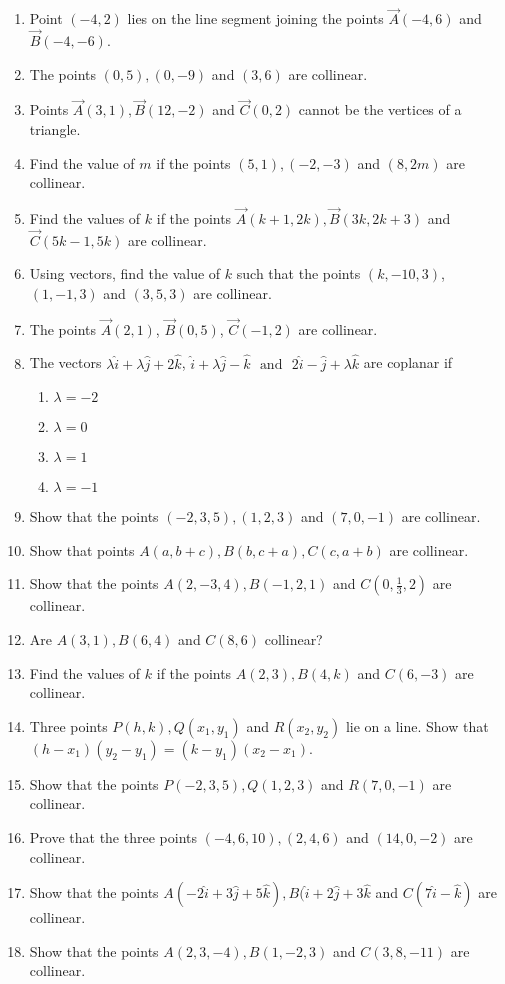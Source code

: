 \begin{enumerate}[label=\thesubsection.\arabic*,ref=\thesubsection.\theenumi]
	\item Point $ (-4,2)$ lies on the line segment joining the points $ \vec{A}(-4,6)$  and  $\vec{B}(-4,-6)$.
 \item The points $(0,5),(0,-9)$ and $(3,6)$ are collinear.
\item Points $\vec{A}(3,1), \vec{B}(12,-2)$  and  $\vec {C}(0,2)$ cannot be the vertices of a triangle.
\item Find the value of $m$ if the points $(5,1),(-2,-3)$  and $(8,2m)$ are collinear.
\item Find the values of $k$ if the points $\vec{A}(k+1,2k),\vec{B}(3k,2k+3)$ and $\vec{C}(5k-1,5k)$ are collinear.
\item Using vectors, find the value of $k$ such that the points $(k,-10,3)$, $(1,-1,3)$  and  $(3,5,3)$ are collinear.
\item The points $\vec{A}(2,1)$, $\vec{B}(0,5)$, $\vec{C}(-1,2)$ are collinear.
\item The vectors $\lambda\hat{i}+\lambda\hat{j}+2\hat{k}$, $\hat{i}+\lambda\hat{j}-\hat{k}$ $\text{ and }$ $2\hat{i}-\hat{j}+\lambda\hat{k}$ are coplanar if
	\begin{enumerate}
\item	$\lambda=-2$
\item $\lambda=0$
\item $\lambda=1$
\item	$\lambda=-1$
\end{enumerate}
\item Show that the points $(-2,3,5), (1,2,3)$ and $(7,0,-1)$ are collinear.
\item Show that points $A(a, b+c), B(b, c+a), C(c, a+b)$ are collinear.
\item Show that the points $A(2,-3,4), B(-1,2,1)$ and $C(0,\frac{1}{3},2)$ are collinear.
\item Are $A(3,1),B(6,4)$ and $C(8,6)$ collinear?
\item Find the values of $k$ if the points $A(2,3), B(4,k)$ and $C(6,-3)$ are collinear.
\item Three points $P(h,k), Q(x_1,y_1)$ and $R(x_2,y_2)$ lie on a line. Show that $(h-x_1)(y_2-y_1)=(k-y_1)(x_2-x_1)$.
\item Show that the points $P(-2,3,5), Q(1,2,3)$ and $R(7,0,-1)$ are collinear. 
\item Prove that the three points $(-4,6,10), (2,4,6)$ and $(14,0,-2)$ are collinear.
\item Show that the points $A(-2\hat{i} +3\hat{j} +5\hat{k}), B(\hat{i}+2\hat{j} +3\hat{k}$ and $C(7\hat{i} -\hat{k})$ are collinear.
\item Show that the points $A(2, 3, -4), B(1, -2, 3)$ and $C(3, 8, -11)$ are collinear.
\end{enumerate}
